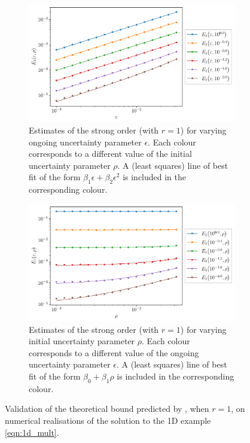 \begin{figure}
	\begin{center}
		\begin{subfigure}{\textwidth}
			\includegraphics[width=\textwidth]{chp04_paper_numerics/figures/multiplicative/str_err_eps_r_1.0_log.pdf}
			\caption{Estimates of the strong order (with \(r = 1\)) for varying ongoing uncertainty parameter \(\epsilon\).
			Each colour corresponds to a different value of the initial uncertainty parameter \(\rho\).
			A (least squares) line of best fit of the form \(\beta_1 \epsilon + \beta_2 \epsilon^2\) is included in the corresponding colour.}
			\label{fig:multiplicative_eps_lines}
		\end{subfigure}
		\begin{subfigure}{\textwidth}
			\includegraphics[width=\textwidth]{chp04_paper_numerics/figures/multiplicative/str_err_rho_r_1.0_log.pdf}
			\caption{Estimates of the strong order (with \(r = 1\)) for varying initial uncertainty parameter \(\rho\).
			Each colour corresponds to a different value of the ongoing uncertainty parameter \(\epsilon\).
			A (least squares) line of best fit of the form \(\beta_0 + \beta_1 \rho\) is included in the corresponding colour.}
			\label{fig:multiplicative_delta_lines}
		\end{subfigure}
		\caption{Validation of the theoretical bound predicted by , when \(r = 1\), on numerical realisations of the solution to the 1D example \eqref{eqn:1d_mult}.}
		\label{fig:multiplicative_delta_eps_lines}
	\end{center}
\end{figure}

